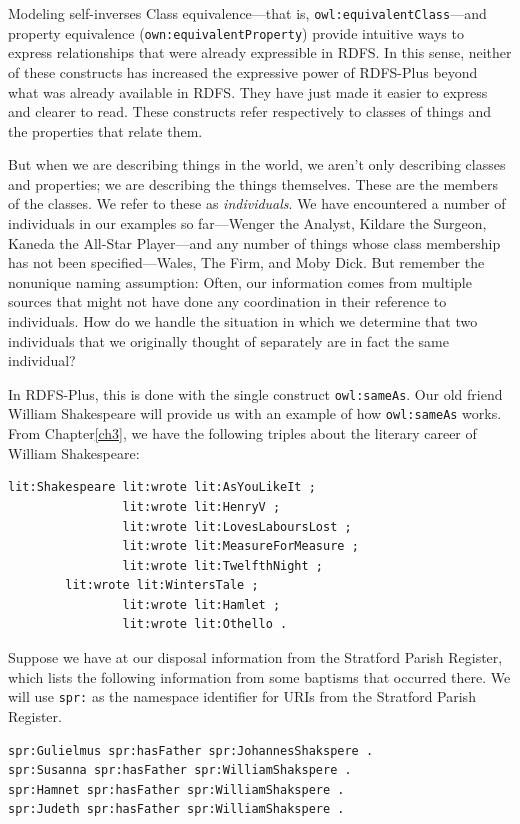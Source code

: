 \begin{challenge}{Modeling self-inverses}
Class equivalence---that is, \texttt{owl:equivalentClass}---and property
equivalence (\texttt{own:equivalentProperty}) provide intuitive ways to express
relationships that were already expressible in RDFS. In this sense,
neither of these constructs has increased the expressive power of
RDFS-Plus beyond what was already available in RDFS. They have just made
it easier to express and clearer to read. These constructs refer
respectively to classes of things and the properties that relate them.

But when we are describing things in the world, we aren't only
describing classes and properties; we are describing the things
themselves. These are the members of the classes. We refer to these as
\emph{individuals}. We have encountered a number of individuals in our examples
so far---Wenger the Analyst, Kildare the Surgeon, Kaneda the All-Star
Player---and any number of things whose class membership has not been
specified---Wales, The Firm, and Moby Dick. But remember the nonunique
naming assumption: Often, our information comes from multiple sources
that might not have done any coordination in their reference to
individuals. How do we handle the situation in which we determine that
two individuals that we originally thought of separately are in fact the
same individual?

In RDFS-Plus, this is done with the single construct \texttt{owl:sameAs}. Our old
friend William Shakespeare will provide us with an example of how
\texttt{owl:sameAs} works. From Chapter\ref{ch3}, we have the following triples about
the literary career of William Shakespeare:

\begin{lstlisting}
lit:Shakespeare lit:wrote lit:AsYouLikeIt ;
                lit:wrote lit:HenryV ;
                lit:wrote lit:LovesLaboursLost ;
                lit:wrote lit:MeasureForMeasure ; 
                lit:wrote lit:TwelfthNight ;
		lit:wrote lit:WintersTale ; 
                lit:wrote lit:Hamlet ;
                lit:wrote lit:Othello .
\end{lstlisting}

Suppose we have at our disposal information from the Stratford Parish
Register, which lists the following information from some baptisms that
occurred there. We will use \texttt{spr:} as the namespace identifier for URIs
from the Stratford Parish Register.

\begin{lstlisting}
spr:Gulielmus spr:hasFather spr:JohannesShakspere .
spr:Susanna spr:hasFather spr:WilliamShakspere .
spr:Hamnet spr:hasFather spr:WilliamShakspere .
spr:Judeth spr:hasFather spr:WilliamShakspere .
\end{lstlisting}


\end{challenge}

